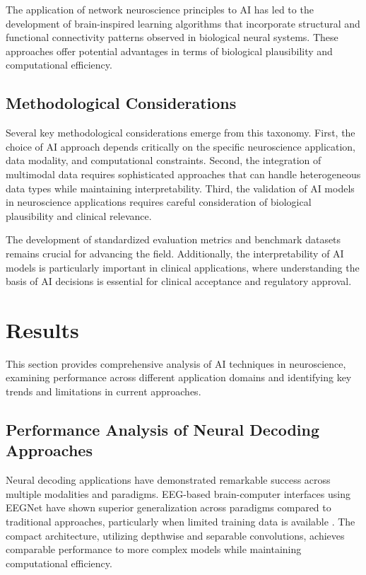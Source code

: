 \documentclass[conference]{IEEEtran}
\begin{document}
The application of network neuroscience principles to AI has led to the development of brain-inspired learning algorithms that incorporate structural and functional connectivity patterns observed in biological neural systems. These approaches offer potential advantages in terms of biological plausibility and computational efficiency.

\subsection{Methodological Considerations}

Several key methodological considerations emerge from this taxonomy. First, the choice of AI approach depends critically on the specific neuroscience application, data modality, and computational constraints. Second, the integration of multimodal data requires sophisticated approaches that can handle heterogeneous data types while maintaining interpretability. Third, the validation of AI models in neuroscience applications requires careful consideration of biological plausibility and clinical relevance.

The development of standardized evaluation metrics and benchmark datasets remains crucial for advancing the field. Additionally, the interpretability of AI models is particularly important in clinical applications, where understanding the basis of AI decisions is essential for clinical acceptance and regulatory approval.

\section{Results}

This section provides comprehensive analysis of AI techniques in neuroscience, examining performance across different application domains and identifying key trends and limitations in current approaches.

\subsection{Performance Analysis of Neural Decoding Approaches}

Neural decoding applications have demonstrated remarkable success across multiple modalities and paradigms. EEG-based brain-computer interfaces using EEGNet have shown superior generalization across paradigms compared to traditional approaches, particularly when limited training data is available \citep{lawhernEEGNetCompactConvolutional2018}. The compact architecture, utilizing depthwise and separable convolutions, achieves comparable performance to more complex models while maintaining computational efficiency.
\end{document}
